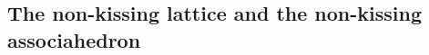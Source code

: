 \documentclass{memo-l}
\theoremstyle{definition}
\renewcommand{\b}[1]{\mathbf{#1}} %
\newcommand{\distinguishedWalk}[2]{\mathsf{dw}(#1,#2)} %
\renewcommand{\top}{\mathrm{top}} %
\newcommand{\bottom}{\mathrm{bot}} %
\newcommand{\closure}[1]{#1^{\mathrm{cl}}} %
\newcommand{\Hom}[1]{\operatorname{{\rm Hom}}_{#1}}
\begin{document}

\subsection*{The non-kissing lattice and the non-kissing associahedron}
\end{document}
